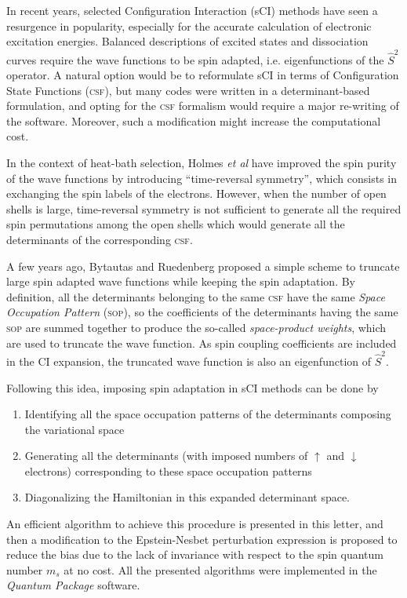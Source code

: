 \documentclass[aip,jcp,reprint,showkeys]{revtex4-1}
\newcommand{\stwo}{\hat{S}^2}
\newcommand{\up}{\uparrow}
\newcommand{\dn}{\downarrow}
\newcommand{\sop}{\textsc{sop}}
\newcommand{\csf}{\textsc{csf}}
\begin{document}
In recent years, selected Configuration Interaction (sCI) methods have seen a resurgence in
popularity,\cite{Greer_1998,Stampfuss_2005,Bytautas_2009,Booth_2009,Giner_2013,Buenker_2014,Holmes_2016,Ohtsuka_2017,Coe_2018}
especially for the accurate calculation of electronic excitation
energies.\cite{Coe_2013,Schriber_2017,Holmes_2017,Loos_2018,Scemama_2018,Dash_2018}
Balanced descriptions of excited states and dissociation curves require
the wave functions to be spin adapted, i.e. eigenfunctions of the $\stwo$
operator. A natural option would be to reformulate sCI in terms of
Configuration State Functions (\csf), but many codes were written in a
determinant-based formulation, and opting for the {\csf} formalism would require
a major re-writing of the software. Moreover, such a modification might
increase the computational cost.\cite{Knowles_1984,Olsen_1988}

In the context of heat-bath selection, Holmes \textit{et al} have 
improved the spin purity of the wave functions by introducing ``time-reversal
symmetry'', \cite{Holmes_2017} which consists in exchanging the spin labels of
the electrons.
However, when the number of open shells is large, time-reversal symmetry is not
sufficient to generate all the required spin permutations among the open shells
which would generate all the determinants of the corresponding \csf.

A few years ago, Bytautas and Ruedenberg proposed a simple scheme to truncate
large spin adapted wave functions while keeping the spin
adaptation.\cite{Bytautas_2007}
By definition, all the determinants belonging to the same {\csf} have the same
\emph{Space Occupation Pattern} (\sop), so the
coefficients of the determinants having the same {\sop}
are summed together to produce the so-called \emph{space-product
weights}, which are used to truncate the wave function. As spin coupling
coefficients are included in the CI expansion, the truncated wave function is
also an eigenfunction of $\stwo$.

Following this idea, imposing spin adaptation in sCI methods can be done by 
\begin{enumerate}
\item Identifying all the space occupation patterns of the determinants composing
      the variational space
\item Generating all the determinants (with imposed numbers of $\up$ and
      $\dn$ electrons) corresponding to these space occupation patterns
\item Diagonalizing the Hamiltonian in this expanded determinant space.
\end{enumerate}
An efficient algorithm to achieve this procedure is presented in this letter,
and then a modification to the Epstein-Nesbet perturbation expression is
proposed to reduce the bias due to the lack of invariance with respect to 
the spin quantum number $m_s$ at no cost.
All the presented algorithms were implemented in the \emph{Quantum Package}
software.\cite{qp}
\end{document}
